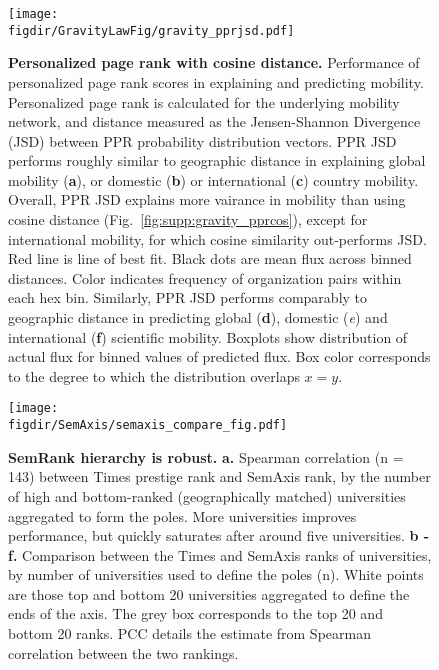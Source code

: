 \documentclass[12pt]{article} %
\def\figdir{../Figs}
\begin{document}
%
%
\begin{figure}[p!]
	\centering
	\texttt{[image: \\figdir/GravityLawFig/gravity\_pprjsd.pdf]}
	\caption{
		\textbf{Personalized page rank with cosine distance.}
		Performance of personalized page rank scores in explaining and predicting mobility.
		Personalized page rank is calculated for the underlying mobility network, and distance measured as the Jensen-Shannon Divergence (JSD) between PPR probability distribution vectors.
		PPR JSD performs roughly similar to geographic distance in explaining global mobility (\textbf{a}), or domestic (\textbf{b}) or international (\textbf{c}) country mobility.
		Overall, PPR JSD explains more vairance in mobility than using cosine distance (Fig.~\ref{fig:supp:gravity_pprcos}), except for international mobility, for which cosine similarity out-performs JSD. 
		Red line is line of best fit. 
		Black dots are mean flux across binned distances.
		Color indicates frequency of organization pairs within each hex bin.
		Similarly, PPR JSD performs comparably to geographic distance in predicting global (\textbf{d}), domestic (\textit{e}) and international (\textbf{f}) scientific mobility. 
		Boxplots show distribution of actual flux for binned values of predicted flux.
		Box color corresponds to the degree to which the distribution overlaps $x = y$.
	}
	\label{fig:supp:gravity_pprjsd}
\end{figure}




%
%
\begin{figure}[hp!]
	\centering
	\texttt{[image: \\figdir/SemAxis/semaxis\_compare\_fig.pdf]}
	\caption{
		\textbf{SemRank hierarchy is robust.}
		\textbf{a.} Spearman correlation (n = 143) between Times prestige rank and SemAxis rank, by the number of high and bottom-ranked (geographically matched) universities aggregated to form the poles. 
		More universities improves performance, but quickly saturates after around five universities. 
		\textbf{b - f.} Comparison between the Times and SemAxis ranks of universities, by number of universities used to define the poles (n). 
		White points are those top and bottom 20 universities aggregated to define the ends of the axis. 
		The grey box corresponds to the top 20 and bottom 20 ranks. 
	  	PCC details the estimate from Spearman correlation between the two rankings. 
	}
	\label{fig:supp:semaxis_compare}
\end{figure}
\end{document}
